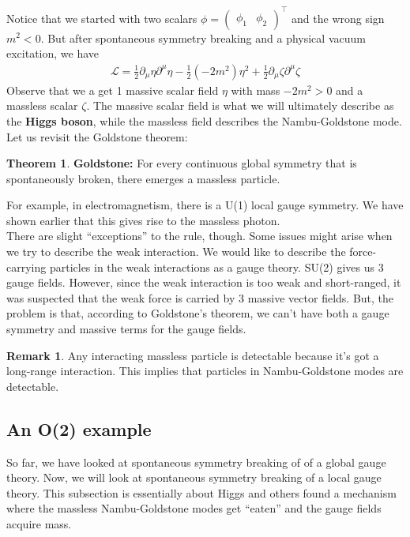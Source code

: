 \documentclass[a4paper,11pt]{article}
\numberwithin{equation}{section}
\theoremstyle{definition}
\newtheorem{thm}{Theorem}[section]
\newtheorem{rmk}{Remark}[section]
\newcommand{\p}{\partial}
\newcommand{\lag}{\mathcal{L}}
\begin{document}
Notice that we started with two scalars $\phi = \begin{pmatrix}
\phi_1&\phi_2
\end{pmatrix}^\top$ and the wrong sign $m^2 < 0$. But after spontaneous symmetry breaking and a physical vacuum excitation, we have
\begin{align}
\lag = \boxed{\frac{1}{2}\p_\mu\eta \p^\mu\eta - \frac{1}{2}(-2m^2)\eta^2} + \boxed{\frac{1}{2}\p_\mu\zeta \p^\mu\zeta}
\end{align}
Observe that we a get 1 massive scalar field $\eta$ with mass $-2m^2 > 0$ and a massless scalar $\zeta$. The massive scalar field is what we will ultimately describe as the \textbf{Higgs boson}, while the massless field describes the Nambu-Goldstone mode. Let us revisit the Goldstone theorem:\\

\begin{thm}
	\textbf{Goldstone:} For every continuous global symmetry that is spontaneously broken, there emerges a massless particle. 
\end{thm}

For example, in electromagnetism, there is a U(1) local gauge symmetry. We have shown earlier that this gives rise to the massless photon.\\

There are slight ``exceptions'' to the rule, though. Some issues might arise when we try to describe the weak interaction. We would like to describe the force-carrying particles in the weak interactions as a gauge theory. SU(2) gives us 3 gauge fields. However, since the weak interaction is too weak and short-ranged, it was suspected that the weak force is carried by 3 massive vector fields. But, the problem is that, according to Goldstone's theorem, we can't have both a gauge symmetry and massive terms for the gauge fields. \\

\begin{rmk}
	Any interacting massless particle is detectable because it's got a long-range interaction. This implies that particles in Nambu-Goldstone modes are detectable. 
\end{rmk}

\subsection{An O(2) example}
So far, we have looked at spontaneous symmetry breaking of of a global gauge theory. Now, we will look at spontaneous symmetry breaking of a local gauge theory. This subsection is essentially about Higgs and others found a mechanism where the massless Nambu-Goldstone modes get ``eaten'' and the gauge fields acquire mass. \\
\end{document}
